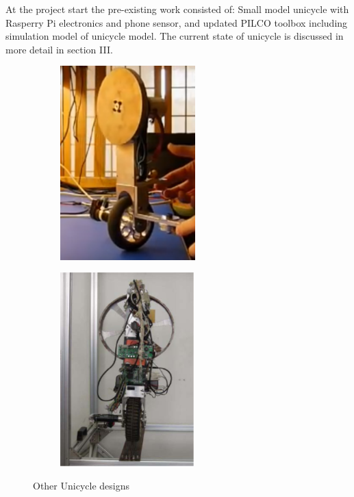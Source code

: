 \documentclass[twoside,twocolumn,12pt]{article}
\begin{document}
\newline
At the project start the pre-existing work consisted of: Small model unicycle with Rasperry Pi electronics and phone sensor, and updated PILCO toolbox including simulation model of unicycle model. The current state of unicycle is discussed in more detail in section III. 
\begin{figure}[t!]
  \centering
  \begin{subfigure}[t]{0.325\textwidth}
    \includegraphics[width=\linewidth,height=7.5cm]{other1}
   \caption{\cite{other1}}
  \label{sub:oother1}
  \end{subfigure}
  \begin{subfigure}[t]{0.325\textwidth}
    \includegraphics[width=\linewidth,height=7.5cm]{other3}
    \caption{\cite{other2}}
  \label{sub:other2}
  \end{subfigure}
  \caption{Other Unicycle designs}
  \label{fig:otheruni}
\end{figure}

\end{document}
